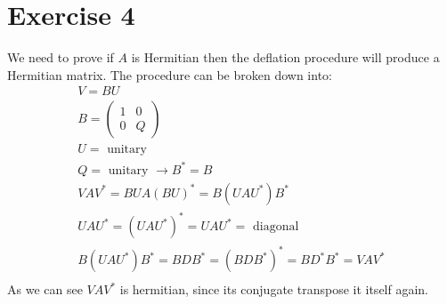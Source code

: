 \section{Exercise 4}
We need to prove if $A$ is Hermitian then the deflation procedure will produce a Hermitian matrix.
The procedure can be broken down into:
\begin{gather*}
V = B U \\
B = \left( \begin{array}{cc}
1 & 0\\
0 & Q
\end{array} \right)\\
U = \text{ unitary } \\
Q = \text{ unitary } \rightarrow B^* = B \\
VAV^* = BUA(BU)^* = B (U A U^*) B^* \\
U A U^* = (U A U^*)^* = UAU^* = \text{ diagonal } \\
B (U A U^*) B^*  = B D B^* = (BDB^*)^* = BD^*B^* = V A V^*\\
\end{gather*}
As we can see $VAV^*$ is hermitian, since its conjugate transpose it itself again.
